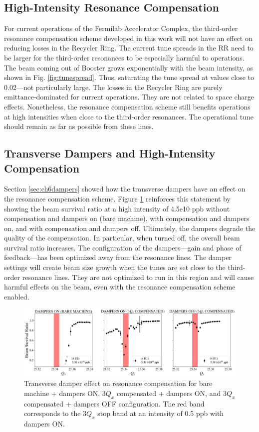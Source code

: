 \subsection{High-Intensity Resonance Compensation}

For current operations of the Fermilab Accelerator Complex, the third-order resonance compensation scheme developed in this work will not have an effect on reducing losses in the Recycler Ring. The current tune spreads in the RR need to be larger for the third-order resonances to be especially harmful to operations. The beam coming out of Booster grows exponentially with the beam intensity, as shown in Fig. \ref{fig:tunespread}. Thus, saturating the tune spread at values close to 0.02---not particularly large. The losses in the Recycler Ring are purely emittance-dominated for current operations. They are not related to space charge effects. Nonetheless, the resonance compensation scheme still benefits operations at high intensities when close to the third-order resonances. The operational tune should remain as far as possible from these lines.  

\subsection{Transverse Dampers and High-Intensity Compensation}

Section \ref{sec:ch6dampers} showed how the transverse dampers have an effect on the resonance compensation scheme. Figure \ref{fig:dampers7} reinforces this statement by showing the beam survival ratio at a high intensity of 4.5e10 ppb without compensation and dampers on (bare machine), with compensation and dampers on, and with compensation and dampers off. Ultimately, the dampers degrade the quality of the compensation. In particular, when turned off, the overall beam survival ratio increases. The configuration of the dampers---gain and phase of feedback---has been optimized away from the resonance lines. The damper settings will create beam size growth when the tunes are set close to the third-order resonance lines. They are not optimized to run in this region and will cause harmful effects on the beam, even with the resonance compensation scheme enabled.

\begin{figure}[H]
    \centering
    \includegraphics[width=\columnwidth]{chapter7/dampers_config.png}
    \caption{Transverse damper effect on resonance compensation for bare machine + dampers ON, $3Q_x$ compensated + dampers ON, and $3Q_x$ compensated + dampers OFF configuration. The red band corresponds to the $3Q_x$ stop band at an intensity of 0.5 ppb with dampers ON.}
    \label{fig:dampers7}
\end{figure}

